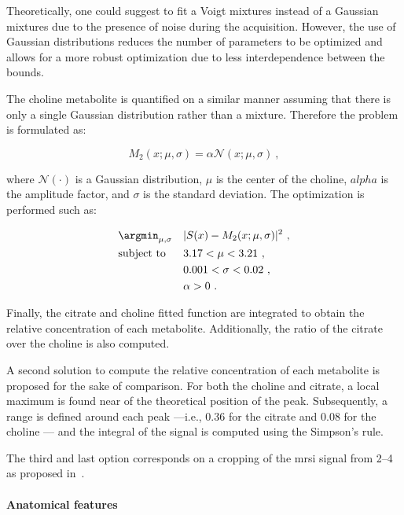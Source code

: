 Theoretically, one could suggest to fit a Voigt mixtures instead of a Gaussian mixtures due to the presence of noise during the acquisition.
However, the use of Gaussian distributions reduces the number of parameters to be optimized and allows for a more robust optimization due to less interdependence between the bounds.

The choline metabolite is quantified on a similar manner assuming that there is only a single Gaussian distribution rather than a mixture.
Therefore the problem is formulated as:

\begin{equation}
  M_2(x; \mu, \sigma) = \alpha \mathcal{N}(x; \mu, \sigma) \ ,
  \label{eq:costcho}
\end{equation}

\noindent where $\mathcal{N}(\cdot)$ is a Gaussian distribution, $\mu$ is the center of the choline, $alpha$ is the amplitude factor, and $\sigma$ is the standard deviation. The optimization is performed such as:

\begin{equation}
\begin{aligned}
& \argmin_{\mathbf{\mu, \sigma}} 
& & | S(x) - M_2(x; \mu, \sigma) |^{2} \ , \label{eq:mincostcho} \\
& \text{subject to}
& & 3.17 < \mu < 3.21 \ , \\
&&& 0.001 < \sigma < 0.02 \ , \\
&&& \alpha > 0 \ .
\end{aligned}
\end{equation}

Finally, the citrate and choline fitted function are integrated to obtain the relative concentration of each metabolite.
Additionally, the ratio of the citrate over the choline is also computed.

A second solution to compute the relative concentration of each metabolite is proposed for the sake of comparison.
For both the choline and citrate, a local maximum is found near of the theoretical position of the peak.
Subsequently, a range is defined around each peak ---i.e., \SI{0.36}{\ppm} for the citrate and \SI{0.08}{\ppm} for the choline --- and the integral of the signal is computed using the Simpson's rule.

The third and last option corresponds on a cropping of the \ac{mrsi} signal from \SIrange{2}{4}{\ppm} as proposed in~\cite{Parfait2012}.

\paragraph{Anatomical features}

